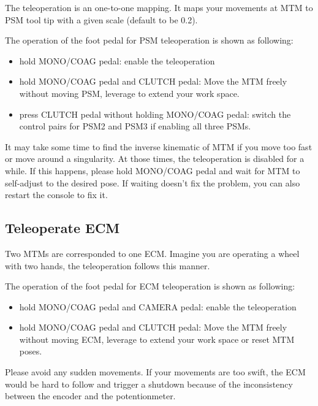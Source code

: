 The teleoperation is an one-to-one mapping. It maps your movements at MTM to PSM tool tip with a given scale (default to be 0.2).

The operation of the foot pedal for PSM teleoperation is shown as following:

\begin{itemize}
    \item hold MONO/COAG pedal: enable the teleoperation
    \item hold MONO/COAG pedal and CLUTCH pedal: Move the MTM freely without moving PSM, leverage to extend your work space.
    \item press CLUTCH pedal without holding MONO/COAG pedal: switch the control pairs for PSM2 and PSM3 if enabling all three PSMs.
\end{itemize}

It may take some time to find the inverse kinematic of MTM if you move too fast or move around a singularity. At those times, the teleoperation is disabled for a while. If this happens, please hold MONO/COAG pedal and wait for MTM to self-adjust to the desired pose. If waiting doesn't fix the problem, you can also restart the console to fix it.

\subsection{Teleoperate ECM}

Two MTMs are corresponded to one ECM. Imagine you are operating a wheel with two hands, the teleoperation follows this manner.

The operation of the foot pedal for ECM teleoperation is shown as following:

\begin{itemize}
    \item hold MONO/COAG pedal and CAMERA pedal: enable the teleoperation
    \item hold MONO/COAG pedal and CLUTCH pedal: Move the MTM freely without moving ECM, leverage to extend your work space or reset MTM poses.
\end{itemize}

Please avoid any sudden movements. If your movements are too swift, the ECM would be hard to follow and trigger a shutdown because of the inconsistency between the encoder and the potentionmeter.




